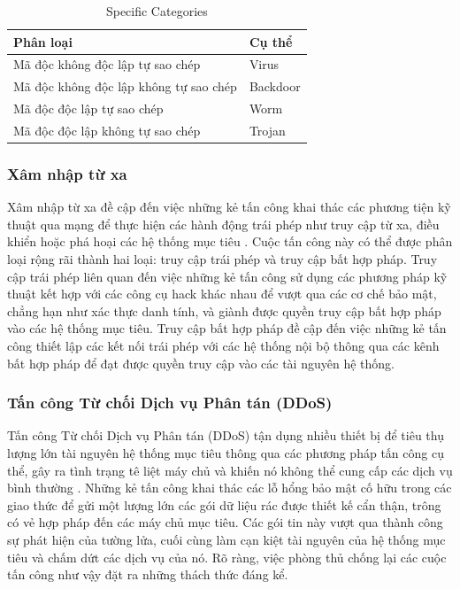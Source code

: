 \documentclass[conference]{IEEEtran}
\begin{document}
\begin{table}[htbp]
\centering
\caption{Specific Categories}
\label{tab:tab1}
\begin{tabular}{C{6cm} C{2cm}}
\toprule
\textbf{Phân loại} & \textbf{Cụ thể} \\
\midrule
Mã độc không độc lập tự sao chép 
    & Virus \\
Mã độc không độc lập không tự sao chép 
    & Backdoor \\
Mã độc độc lập tự sao chép
    & Worm \\
Mã độc độc lập không tự sao chép
    & Trojan \\
\bottomrule
\end{tabular}
\end{table}

\subsubsection{Xâm nhập từ xa}
Xâm nhập từ xa đề cập đến việc những kẻ tấn công khai thác các phương tiện kỹ thuật qua mạng để thực hiện các hành động trái phép như truy cập từ xa, điều khiển hoặc phá hoại các hệ thống mục tiêu \cite{ref25}. Cuộc tấn công này có thể được phân loại rộng rãi thành hai loại: truy cập trái phép và truy cập bất hợp pháp. Truy cập trái phép liên quan đến việc những kẻ tấn công sử dụng các phương pháp kỹ thuật kết hợp với các công cụ hack khác nhau để vượt qua các cơ chế bảo mật, chẳng hạn như xác thực danh tính, và giành được quyền truy cập bất hợp pháp vào các hệ thống mục tiêu. Truy cập bất hợp pháp đề cập đến việc những kẻ tấn công thiết lập các kết nối trái phép với các hệ thống nội bộ thông qua các kênh bất hợp pháp để đạt được quyền truy cập vào các tài nguyên hệ thống.

\subsubsection{Tấn công Từ chối Dịch vụ Phân tán (DDoS)}
Tấn công Từ chối Dịch vụ Phân tán (DDoS) tận dụng nhiều thiết bị để tiêu thụ lượng lớn tài nguyên hệ thống mục tiêu thông qua các phương pháp tấn công cụ thể, gây ra tình trạng tê liệt máy chủ và khiến nó không thể cung cấp các dịch vụ bình thường \cite{ref14}. Những kẻ tấn công khai thác các lỗ hổng bảo mật cố hữu trong các giao thức để gửi một lượng lớn các gói dữ liệu rác được thiết kế cẩn thận, trông có vẻ hợp pháp đến các máy chủ mục tiêu. Các gói tin này vượt qua thành công sự phát hiện của tường lửa, cuối cùng làm cạn kiệt tài nguyên của hệ thống mục tiêu và chấm dứt các dịch vụ của nó. Rõ ràng, việc phòng thủ chống lại các cuộc tấn công như vậy đặt ra những thách thức đáng kể.
\end{document}
